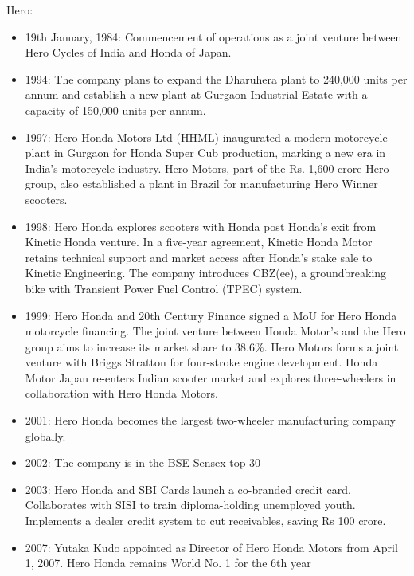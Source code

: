 Hero:\\
\begin{itemize}
	\item 19th January, 1984:
	Commencement of operations as a joint venture between Hero Cycles of India and Honda of Japan.
	
	\item 1994:
	The company plans to expand the Dharuhera plant to 240,000 units per annum and establish a new plant at Gurgaon Industrial Estate with a capacity of 150,000 units per annum.
	
	\item 1997:
	Hero Honda Motors Ltd (HHML) inaugurated a modern motorcycle plant in Gurgaon for Honda Super Cub production, marking a new era in India's motorcycle industry. Hero Motors, part of the Rs. 1,600 crore Hero group, also established a plant in Brazil for manufacturing Hero Winner scooters.
	
	\item 1998:
	Hero Honda explores scooters with Honda post Honda's exit from Kinetic Honda venture. In a five-year agreement, Kinetic Honda Motor retains technical support and market access after Honda's stake sale to Kinetic Engineering. The company introduces CBZ(ee), a groundbreaking bike with Transient Power Fuel Control (TPEC) system.
	
	\item 1999:
	Hero Honda and 20th Century Finance signed a MoU for Hero Honda motorcycle financing. The joint venture between Honda Motor’s and the Hero group aims to increase its market share to 38.6\%. Hero Motors forms a joint venture with Briggs Stratton for four-stroke engine development. Honda Motor Japan re-enters Indian scooter market and explores three-wheelers in collaboration with Hero Honda Motors.
	
	\item 2001:
	Hero Honda becomes the largest two-wheeler manufacturing company globally.
	
	\item 2002:
	The company is in the BSE Sensex top 30
	
	\item 2003:
	Hero Honda and SBI Cards launch a co-branded credit card. Collaborates with SISI to train diploma-holding unemployed youth. Implements a dealer credit system to cut receivables, saving Rs 100 crore.
	
	\item 2007:
	Yutaka Kudo appointed as Director of Hero Honda Motors from April 1, 2007. Hero Honda remains World No. 1 for the 6th year
	

\end{itemize}
